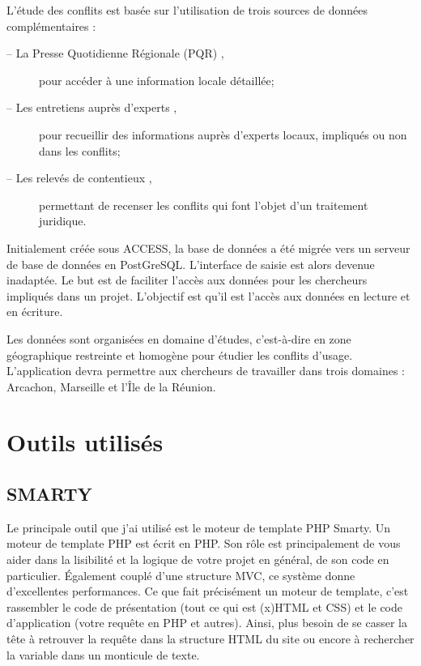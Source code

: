 \documentclass[12pt,a4paper,titlepage,twoside]{report}
\begin{document}
L'étude des conflits est basée sur l’utilisation de trois sources de données complémentaires :
\begin{description}	
\item[–	La Presse Quotidienne Régionale  (PQR) ,] pour accéder à une information locale détaillée;
\item[–	Les entretiens auprès d’experts ,] pour recueillir des informations auprès d’experts locaux, impliqués ou non dans les conflits; 	
\item[–	Les relevés de contentieux ,] permettant de recenser les conflits qui font l’objet d’un  traitement juridique. \newline\newline
\end{description}

Initialement créée sous ACCESS, la base de données a été migrée vers un serveur de base de données en PostGreSQL. L’interface de saisie est alors devenue inadaptée. Le but est de faciliter l’accès aux données pour les chercheurs impliqués dans un projet. L'objectif est qu'il est l'accès aux données en lecture et en écriture. \newline \newline

Les données sont organisées en domaine d'études, c'est-à-dire en zone géographique restreinte et homogène pour étudier les conflits d'usage. L'application devra permettre aux chercheurs de travailler dans trois domaines : Arcachon, Marseille et l'Île de la Réunion.

\section{Outils utilisés}
\subsection{SMARTY}
Le principale outil que j'ai utilisé est le moteur de template PHP Smarty. \newline\newline
Un moteur de template PHP est écrit en PHP. Son rôle est principalement de vous aider dans la lisibilité et la logique de votre projet en général, de son code en particulier. Également couplé d'une structure MVC, ce système donne d'excellentes performances. \newline
Ce que fait précisément un moteur de template, c'est rassembler le code de présentation (tout ce qui est (x)HTML et CSS) et le code d'application (votre requête en PHP et autres). \newline
Ainsi, plus besoin de se casser la tête à retrouver la requête dans la structure HTML du site ou encore à rechercher la variable dans un monticule de texte. \newline\newline
\end{document}
